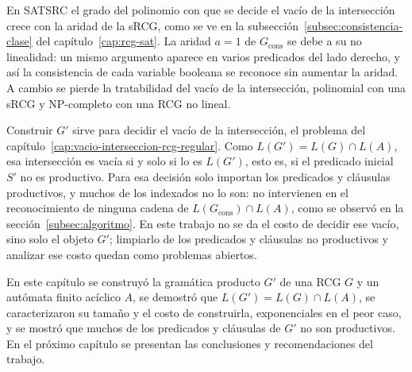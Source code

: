 En SATSRC el grado del polinomio con que se decide el vacío de la
intersección crece con la aridad de la sRCG, como se ve en la
subsección~\ref{subsec:consistencia-clase} del
capítulo~\ref{cap:rcg-sat}. La aridad $a = 1$ de $G_{\mathrm{cons}}$ se
debe a su no linealidad: un mismo argumento aparece en varios predicados
del lado derecho, y así la consistencia de cada variable booleana se
reconoce sin aumentar la aridad. A cambio se pierde la tratabilidad del
vacío de la intersección, polinomial con una sRCG y NP-completo con una
RCG no lineal.

Construir $G'$ sirve para decidir el vacío de la intersección, el
problema del capítulo~\ref{cap:vacio-interseccion-rcg-regular}. Como
$L(G') = L(G) \cap L(A)$, esa intersección es vacía si y solo si lo es
$L(G')$, esto es, si el predicado inicial $S'$ no es productivo. Para esa
decisión solo importan los predicados y cláusulas productivos, y muchos
de los indexados no lo son: no intervienen en el reconocimiento de
ninguna cadena de $L(G_{\mathrm{cons}}) \cap L(A)$, como se observó en la
sección~\ref{subsec:algoritmo}. En este trabajo no se da el costo de
decidir ese vacío, sino solo el objeto $G'$; limpiarlo de los predicados
y cláusulas no productivos y analizar ese costo quedan como problemas
abiertos.

En este capítulo se construyó la gramática producto $G'$ de una RCG $G$
y un autómata finito acíclico $A$, se demostró que
$L(G') = L(G) \cap L(A)$, se caracterizaron su tamaño y el costo de
construirla, exponenciales en el peor caso, y se mostró que muchos de
los predicados y cláusulas de $G'$ no son productivos. En el próximo
capítulo se presentan las conclusiones y recomendaciones del trabajo.

